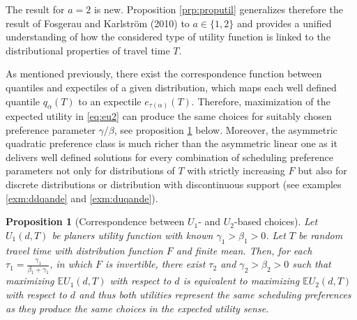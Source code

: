 \documentclass[
]{article}
\newtheorem{proposition}{Proposition}[section]
\theoremstyle{definition}
\theoremstyle{definition}
\theoremstyle{definition}
\theoremstyle{definition}
\theoremstyle{remark}
\begin{document}
The result for \(a=2\) is new. Proposition \ref{prp:proputil} generalizes therefore the result of Fosgerau and Karlström (2010) to \(a\in\{1,2\}\) and provides a unified understanding of how the considered type of utility function is linked to the distributional properties of travel time \(T\).

As mentioned previously, there exist the correspondence function between quantiles and expectiles of a given distribution, which maps each well defined quantile \(q_{\alpha}(T)\) to an expectile \(e_{\tau(\alpha)}(T)\). Therefore, maximization of the expected utility in \eqref{eq:eu2} can produce the same choices for suitably chosen preference parameter \(\gamma/\beta\), see proposition \ref{prp:proputil2} below. Moreover, the asymmetric quadratic preference class is much richer than the asymmetric linear one as it delivers well defined solutions for every combination of scheduling preference parameters not only for distributions of \(T\) with strictly increasing \(F\) but also for discrete distributions or distribution with discontinuous support (see examples \ref{exm:ddqande} and \ref{exm:duqande}).

\begin{proposition}[Correspondence between $U_1$- and $U_2$-based choices]
\protect\hypertarget{prp:proputil2}{}\label{prp:proputil2}Let \(U_1(d,T)\) be planers utility function with known \(\gamma_1>\beta_1>0\). Let \(T\) be random travel time with distribution function \(F\) and finite mean. Then, for each \(\tau_1 = \frac{\gamma_1}{\beta_1+\gamma_1}\), in which \(F\) is invertible, there exist \(\tau_2\) and \(\gamma_2>\beta_2>0\) such that maximizing \(\mathbb E U_1(d,T)\) with respect to \(d\) is equivalent to maximizing \(\mathbb E U_2(d,T)\) with respect to \(d\) and thus both utilities represent the same scheduling preferences as they produce the same choices in the expected utility sense.
\end{proposition}
\end{document}
